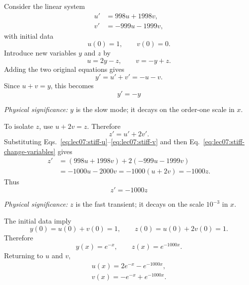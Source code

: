 Consider the linear system
\begin{align}
    u' &= 998u+1998v,
    \label{eq:lec07:stiff-u}\\
    v' &= -999u-1999v,
    \label{eq:lec07:stiff-v}
\end{align}
with initial data
\begin{equation}
    u(0)=1,
    \qquad
    v(0)=0.
    \label{eq:lec07:stiff-initial-data}
\end{equation}
Introduce new variables $y$ and $z$ by
\begin{equation}
    u=2y-z,
    \qquad
    v=-y+z.
    \label{eq:lec07:stiff-change-variables}
\end{equation}
Adding the two original equations gives
\begin{equation}
    y'=u'+v'=-u-v.
    \label{eq:lec07:y-prime-start}
\end{equation}
Since $u+v=y$, this becomes
\begin{equation}
    \boxed{y'=-y}
    \label{eq:lec07:y-prime}
\end{equation}

\textit{Physical significance:} $y$ is the slow mode; it decays on the
order-one scale in $x$.

To isolate $z$, use $u+2v=z$. Therefore
\begin{equation}
    z'=u'+2v'.
    \label{eq:lec07:z-prime-start}
\end{equation}
Substituting Eqs.~\eqref{eq:lec07:stiff-u}--\eqref{eq:lec07:stiff-v}
and then Eq.~\eqref{eq:lec07:stiff-change-variables} gives
\begin{align}
    z'
    &= (998u+1998v)+2(-999u-1999v)
    \label{eq:lec07:z-prime-algebra-one}\\
    &= -1000u-2000v
    = -1000(u+2v)
    = -1000z.
    \label{eq:lec07:z-prime-algebra-two}
\end{align}
Thus
\begin{equation}
    \boxed{z'=-1000z}
    \label{eq:lec07:z-prime}
\end{equation}

\textit{Physical significance:} $z$ is the fast transient; it decays on the
scale $10^{-3}$ in $x$.

The initial data imply
\begin{equation}
    y(0)=u(0)+v(0)=1,
    \qquad
    z(0)=u(0)+2v(0)=1.
    \label{eq:lec07:yz-initial-data}
\end{equation}
Therefore
\begin{equation}
    y(x)=e^{-x},
    \qquad
    z(x)=e^{-1000x}.
    \label{eq:lec07:yz-solutions}
\end{equation}
Returning to $u$ and $v$,
\begin{align}
    \boxed{u(x)=2e^{-x}-e^{-1000x}},
    \label{eq:lec07:u-solution}\\
    \boxed{v(x)=-e^{-x}+e^{-1000x}}.
    \label{eq:lec07:v-solution}
\end{align}

